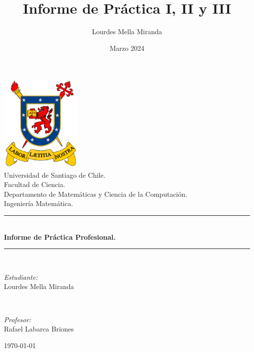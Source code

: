\documentclass{article}[14pts]
\title{Informe de Práctica I, II y III}
\author{Lourdes Mella Miranda}
\date{Marzo 2024}
\begin{document}
\begin{titlepage}
\begin{center}

\includegraphics[width=0.3\textwidth]{images/logo_usach.png}\\[1cm]


{\large Universidad de Santiago de Chile.}\\[0.5cm]
{\large Facultad de Ciencia.}\\[0.5cm]
{\large Departamento de Matemáticas y Ciencia de la Computación.}\\[0.5cm]

{\large Ingeniería Matemática.}\\[0.5cm]

\rule{\linewidth}{0.5mm} \\[0.4cm]
{ \huge \bfseries Informe de Práctica Profesional. \\[0.4cm] }
\rule{\linewidth}{0.5mm} \\[1.5cm]

\noindent
\begin{minipage}{0.4\textwidth}
  \begin{flushleft} \large
  \end{flushleft}
\end{minipage}%
\begin{minipage}{0.4\textwidth}
  \begin{flushright} \large
    \emph{Estudiante:} \\
   Lourdes Mella Miranda
  \end{flushright}
\end{minipage}
\\

\vspace{1cm}

\noindent
\begin{minipage}{0.4\textwidth}
  \begin{flushleft} \large
  \end{flushleft}
\end{minipage}%
\begin{minipage}{0.4\textwidth}
  \begin{flushright} \large
    \emph{Profesor:} \\
   Rafael Labarca Briones
  \end{flushright}
\end{minipage}

\vfill

{\large \today}
\end{center}
\end{titlepage}
\end{document}
